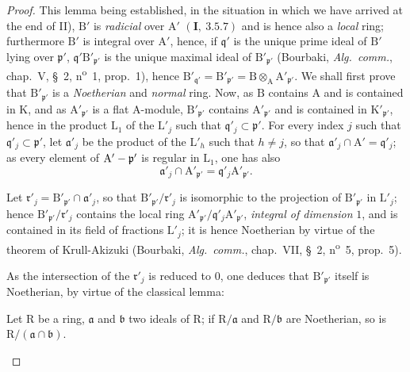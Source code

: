 \begin{proof}
This lemma being established, in the situation in which we have arrived at the end of II),
$\mathrm{B}'$ is \emph{radicial} over $\mathrm{A}'$ $(\mathbf{I},~3.5.7)$ and is hence also a \emph{local} ring; furthermore $\mathrm{B}'$ is
integral over $\mathrm{A}'$, hence, if $\mathfrak{q}'$ is the unique prime ideal of $\mathrm{B}'$ lying over $\mathfrak{p}'$, $\mathfrak{q}'\mathrm{B}'_{\mathfrak{p}'}$ is the unique
maximal ideal of $\mathrm{B}'_{\mathfrak{p}'}$ (Bourbaki, \emph{Alg.~comm.}, chap.~V, \S~2, n\textsuperscript{o}~1, prop.~1), hence
$\mathrm{B}'_{\mathfrak{q}'}=\mathrm{B}'_{\mathfrak{p}'}=\mathrm{B}\otimes_\mathrm{A}\mathrm{A}'_{\mathfrak{p}'}$. We shall first prove that $\mathrm{B}'_{\mathfrak{p}'}$ is a \emph{Noetherian}
and \emph{normal} ring. Now, as $\mathrm{B}$ contains $\mathrm{A}$ and is contained in $\mathrm{K}$, and as $\mathrm{A}'_{\mathfrak{p}'}$ is a flat $\mathrm{A}$-module,
$\mathrm{B}'_{\mathfrak{p}'}$ contains $\mathrm{A}'_{\mathfrak{p}'}$ and is contained in $\mathrm{K}'_{\mathfrak{p}'}$, hence in the product $\mathrm{L}_1$ of the $\mathrm{L}'_j$ such that $\mathfrak{q}'_j\subset\mathfrak{p}'$.
For every index $j$ such that $\mathfrak{q}'_j\subset\mathfrak{p}'$, let $\mathfrak{a}'_j$ be the product of the $\mathrm{L}'_h$ such that $h\neq j$, so that
$\mathfrak{a}'_j\cap\mathrm{A}'=\mathfrak{q}'_j$; as every element of $\mathrm{A}'-\mathfrak{p}'$ is regular in $\mathrm{L}_1$, one has also
\[
  \mathfrak{a}'_j\cap\mathrm{A}'_{\mathfrak{p}'}=\mathfrak{q}'_j\mathrm{A}'_{\mathfrak{p}'}.
\]

Let $\mathfrak{r}'_j=\mathrm{B}'_{\mathfrak{p}'}\cap\mathfrak{a}'_j$, so that $\mathrm{B}'_{\mathfrak{p}'}/\mathfrak{r}'_j$ is isomorphic to the projection of $\mathrm{B}'_{\mathfrak{p}'}$ in $\mathrm{L}'_j$;
hence $\mathrm{B}'_{\mathfrak{p}'}/\mathfrak{r}'_j$ contains the local ring $\mathrm{A}'_{\mathfrak{p}'}/\mathfrak{q}'_j\mathrm{A}'_{\mathfrak{p}'}$, \emph{integral of dimension} $1$, and is contained
in its field of fractions $\mathrm{L}'_j$; it is hence Noetherian by virtue of the theorem of
Krull-Akizuki (Bourbaki, \emph{Alg.~comm.}, chap.~VII, \S~2, n\textsuperscript{o}~5, prop.~5).


As the intersection of the $\mathfrak{r}'_j$ is reduced to $0$, one deduces that $\mathrm{B}'_{\mathfrak{p}'}$ itself is
Noetherian, by virtue of the classical lemma:

\begin{lemma}[6.14.1.4]
\label{IV.6.14.1.4}
Let $\mathrm{R}$ be a ring, $\mathfrak{a}$ and $\mathfrak{b}$ two ideals of $\mathrm{R}$; if $\mathrm{R}/\mathfrak{a}$ and $\mathrm{R}/\mathfrak{b}$
are Noetherian, so is $\mathrm{R}/(\mathfrak{a}\cap\mathfrak{b})$.
\end{lemma}


\end{proof}
